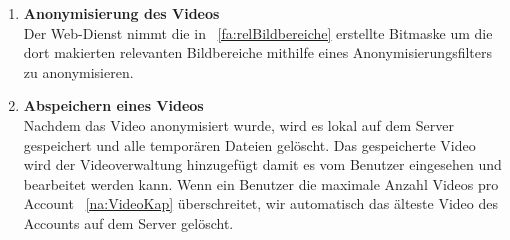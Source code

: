 \begin{enumerate}
\item  \label{fa:anonymVideo}\textbf{Anonymisierung des Videos} \hfill \\
Der \gls{Web-Dienst} nimmt die in ~\eqref{fa:relBildbereiche} erstellte Bitmaske um die dort makierten relevanten Bildbereiche mithilfe eines Anonymisierungsfilters zu \gls{anonymisieren}.

\item \label{fa:speichVideo}\textbf{Abspeichern eines  Videos} \hfill \\
Nachdem das Video anonymisiert wurde, wird es lokal auf dem Server gespeichert und alle temporären Dateien gelöscht. Das gespeicherte Video wird der Videoverwaltung hinzugefügt damit es vom Benutzer eingesehen und bearbeitet werden kann. Wenn ein Benutzer die maximale Anzahl Videos pro Account ~\eqref{na:VideoKap} überschreitet, wir automatisch das älteste Video des Accounts auf dem Server gelöscht.
\end{enumerate}

